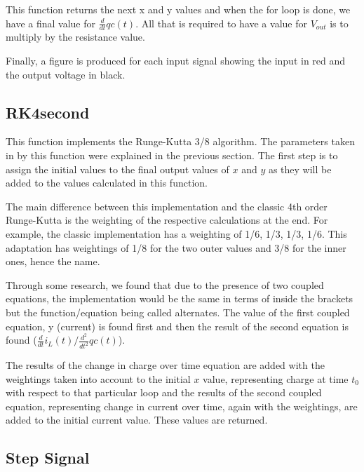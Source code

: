 \documentclass[a4paper, 12pt]{article}
\begin{document}
This function returns the next x and y values and when the for loop is done, we have a final value for $\frac{d}{dt}qc(t)$. All that is required to have a value for $V_{out}$ is to multiply by the resistance value.

Finally, a figure is produced for each input signal showing the input in red and the output voltage in black.
\newpage
\subsection{RK4second}



This function implements the Runge-Kutta 3/8 algorithm. The parameters taken in by this function were explained in the previous section. The first step is to assign the initial values to the final output values of $x$ and $y$ as they will be added to the values calculated in this function.

The main difference between this implementation and the classic 4th order Runge-Kutta is the weighting of the respective calculations at the end. For example, the classic implementation has a weighting of 1/6, 1/3, 1/3, 1/6. This adaptation has weightings of 1/8 for the two outer values and 3/8 for the inner ones, hence the name.\cite{rkequ}\cite{rkequ1}

Through some research, we found that due to the presence of two coupled equations, the implementation would be the same in terms of inside the brackets but the function/equation being called alternates.\cite{2equations} The value of the first coupled equation, y (current) is found first and then the result of the second equation is found ($\frac{d}{dt}i_{L}(t)/\frac{d^2}{dt^2}qc(t)$).

The results of the change in charge over time equation are added with the weightings taken into account to the initial $x$ value, representing charge at time $t_{0}$ with respect to that particular loop and the results of the second coupled equation, representing change in current over time, again with the weightings, are added to the initial current value. These values are returned.

\newpage
\subsection{Step Signal}
\end{document}
